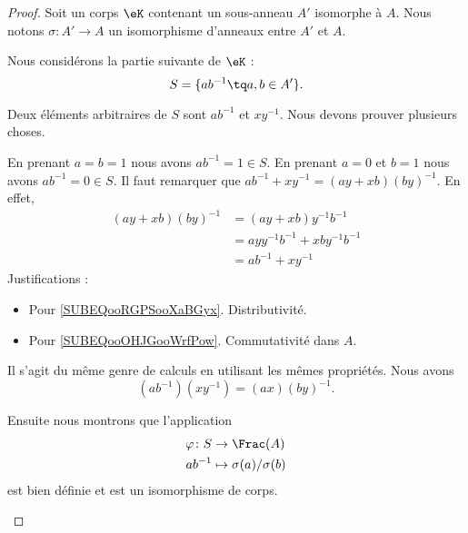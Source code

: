 \begin{proof}
	Soit un corps \( \eK\) contenant un sous-anneau \( A'\) isomorphe à \( A\). Nous notons \( \sigma\colon A'\to A\) un isomorphisme d'anneaux entre \( A'\) et \( A\).

	\begin{subproof}

		Nous considérons la partie suivante de \( \eK\) :
		\begin{equation}
			S=\{ ab^{-1}\tq a,b\in A' \}.
		\end{equation}

		Deux éléments arbitraires de \( S\) sont \( ab^{-1}\) et \( xy^{-1}\). Nous devons prouver plusieurs choses.
		\begin{subproof}
			\spitem[Neutres]
			En prenant \( a=b=1\) nous avons \( ab^{-1}=1\in S\). En prenant \( a=0\) et \( b=1\) nous avons \( ab^{-1}=0\in S\).
			\spitem[Somme]
			Il faut remarquer que \( ab^{-1}+xy^{-1}=(ay+xb)(by)^{-1}\). En effet,
			\begin{subequations}
				\begin{align}
					(ay+xb)(by)^{-1} & =(ay+xb)y^{-1}b^{-1}                                           \\
					                 & =ayy^{-1}b^{-1}+xby^{-1}b^{-1}     \label{SUBEQooRGPSooXaBGyx} \\
					                 & =ab^{-1}+xy^{-1}       \label{SUBEQooOHJGooWrfPow}
				\end{align}
			\end{subequations}
			Justifications :
			\begin{itemize}
				\item Pour \eqref{SUBEQooRGPSooXaBGyx}. Distributivité.
				\item Pour \eqref{SUBEQooOHJGooWrfPow}. Commutativité dans \( A\).
			\end{itemize}
			\spitem[Produit]
			Il s'agit du même genre de calculs en utilisant les mêmes propriétés. Nous avons
			\begin{equation}
				(ab^{-1})(xy^{-1})=(ax)(by)^{-1}.
			\end{equation}
		\end{subproof}



		Ensuite nous montrons que l'application
		\begin{equation}
			\begin{aligned}
				\varphi\colon S & \to \Frac(A)                \\
				ab^{-1}         & \mapsto \sigma(a)/\sigma(b)
			\end{aligned}
		\end{equation}
		est bien définie et est un isomorphisme de corps.


\end{subproof}
\end{proof}

